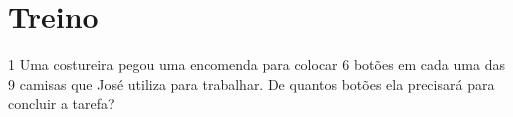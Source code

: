 \section*{Treino}

\num{1} Uma costureira pegou uma encomenda para colocar 6 botões em
cada uma das 9 camisas que José utiliza para trabalhar. De quantos botões
ela precisará para concluir a tarefa?

